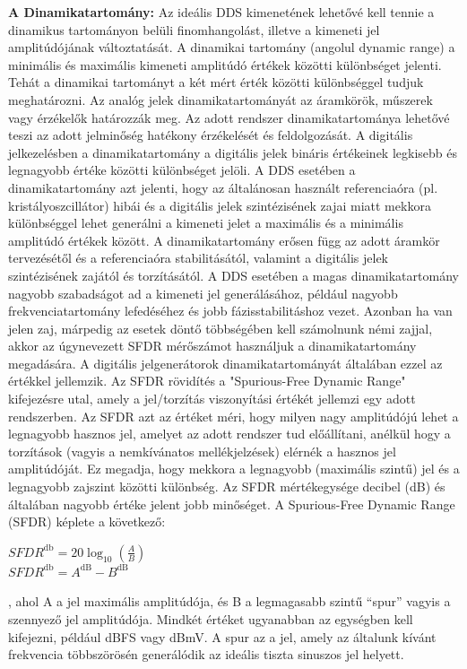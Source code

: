 \documentclass[a4paper,12pt]{article}
\begin{document}
			\textbf{A Dinamikatartomány:} Az ideális DDS kimenetének lehetővé kell tennie a dinamikus tartományon belüli finomhangolást, illetve a kimeneti jel amplitúdójának változtatását. A dinamikai tartomány (angolul dynamic range) a minimális és maximális kimeneti amplitúdó értékek közötti különbséget jelenti. Tehát a dinamikai tartományt a két mért érték közötti különbséggel tudjuk meghatározni. Az analóg jelek dinamikatartományát az áramkörök, műszerek vagy érzékelők határozzák meg. Az adott rendszer dinamikatartománya lehetővé teszi az adott jelminőség hatékony érzékelését és feldolgozását. A digitális jelkezelésben a dinamikatartomány a digitális jelek bináris értékeinek legkisebb és legnagyobb értéke közötti különbséget jelöli.
			A DDS esetében a dinamikatartomány azt jelenti, hogy az általánosan használt referenciaóra (pl. kristályoszcillátor) hibái és a digitális jelek szintézisének zajai miatt mekkora különbséggel lehet generálni a kimeneti jelet a maximális és a minimális amplitúdó értékek között.
			A dinamikatartomány erősen függ az adott áramkör tervezésétől és a referenciaóra stabilitásától, valamint a digitális jelek szintézisének zajától és torzításától. A DDS esetében a magas dinamikatartomány nagyobb szabadságot ad a kimeneti jel generálásához, például nagyobb frekvenciatartomány lefedéséhez és jobb fázisstabilitáshoz vezet. 
			Azonban ha van jelen zaj, márpedig az esetek döntő többségében kell számolnunk némi zajjal, akkor az úgynevezett SFDR mérőszámot használjuk a dinamikatartomány megadására. A digitális jelgenerátorok dinamikatartományát általában ezzel az értékkel jellemzik.  
			Az SFDR rövidítés a "Spurious-Free Dynamic Range" kifejezésre utal, amely a jel/torzítás viszonyítási értékét jellemzi egy adott rendszerben. Az SFDR azt az értéket méri, hogy milyen nagy amplitúdójú lehet a legnagyobb hasznos jel, amelyet az adott rendszer tud előállítani, anélkül hogy a torzítások (vagyis a nemkívánatos mellékjelzések) elérnék a hasznos jel amplitúdóját. Ez megadja, hogy mekkora a legnagyobb (maximális szintű) jel és a legnagyobb zajszint közötti különbség. Az SFDR mértékegysége decibel (dB) és általában nagyobb értéke jelent jobb minőséget.
			A Spurious-Free Dynamic Range (SFDR) képlete a következő:
			\begin{center}
				$SFDR^{\mathrm{db}} = 20 \log_{10} \left( \frac{A}{B} \right)$\\
				$SFDR^{\mathrm{db}} = A^{\mathrm{dB}} - B^{\mathrm{dB}}$
			\end{center}
			, ahol A a jel maximális amplitúdója, és B a legmagasabb szintű “spur” vagyis a szennyező jel amplitúdója. Mindkét értéket ugyanabban az egységben kell kifejezni, például dBFS vagy dBmV. A spur az a jel, amely az általunk kívánt frekvencia többszörösén generálódik az ideális tiszta sinuszos jel helyett.
\end{document}
